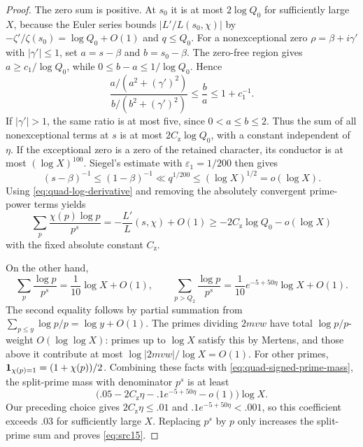 \begin{proof}
The zero sum is positive.  At $s_0$ it is at most $2\log Q_0$ for
sufficiently large $X$, because
the Euler series bounds $|L'/L(s_0,\chi)|$ by
$-\zeta'/\zeta(s_0)=\log Q_0+O(1)$ and $q\leq Q_0$.
For a nonexceptional zero $\rho=\beta+i\gamma'$ with
$|\gamma'|\leq1$, set $a=s-\beta$ and $b=s_0-\beta$.
The zero-free region gives $a\geq c_1/\log Q_0$, while
$0\leq b-a\leq1/\log Q_0$.  Hence
\[
 \frac{a/(a^2+(\gamma')^2)}{b/(b^2+(\gamma')^2)}
 \leq\frac ba\leq1+c_1^{-1}.
\]
If $|\gamma'|>1$, the same ratio is at most five, since
$0<a\leq b\leq2$.  Thus the sum of all nonexceptional terms at $s$
is at most $2C_{\mathrm z}\log Q_0$, with a constant independent of
$\eta$.
If the exceptional zero is a zero of the retained character, its
conductor is at most $(\log X)^{100}$.  Siegel's estimate with
$\varepsilon_1=1/200$ then gives
\[
 (s-\beta)^{-1}\leq(1-\beta)^{-1}
          \ll q^{1/200}\leq(\log X)^{1/2}=o(\log X).
\]
Using \eqref{eq:quad-log-derivative} and removing the absolutely
convergent prime-power terms yields
\begin{equation}\label{eq:quad-signed-prime-mass}
 \sum_p\frac{\chi(p)\log p}{p^s}
       =-\frac{L'}L(s,\chi)+O(1)
       \geq-2C_{\mathrm z}\log Q_0-o(\log X)
\end{equation}
with the fixed absolute constant $C_{\mathrm z}$.

On the other hand,
\[
 \sum_p\frac{\log p}{p^s}=\frac1{10}\log X+O(1),\qquad
 \sum_{p>Q_2}\frac{\log p}{p^s}
       =\frac1{10}e^{-5+50\eta}\log X+O(1).
\]
The second equality follows by partial summation from
$\sum_{p\leq y}\log p/p=\log y+O(1)$.
The primes dividing $2mvw$ have total $\log p/p$-weight
$O(\log\log X)$: primes up to $\log X$ satisfy this by Mertens,
and those above it contribute at most
$\log|2mvw|/\log X=O(1)$.
For other primes, $\mathbf 1_{\chi(p)=1}=(1+\chi(p))/2$.
Combining these facts with \eqref{eq:quad-signed-prime-mass}, the
split-prime mass with denominator $p^s$ is at least
\[
 \bigl(.05-2C_{\mathrm z}\eta-.1e^{-5+50\eta}-o(1)\bigr)\log X.
\]
Our preceding choice gives $2C_{\mathrm z}\eta\leq.01$ and
$.1e^{-5+50\eta}<.001$, so this coefficient exceeds $.03$ for
sufficiently large $X$.  Replacing $p^s$ by $p$ only increases the
split-prime sum and proves \eqref{eq:src15}.


\end{proof}
